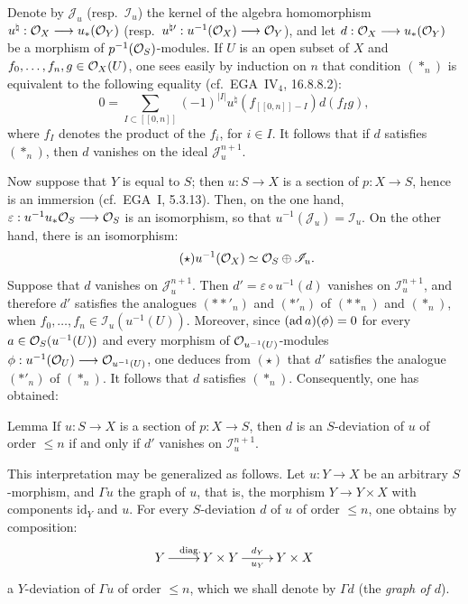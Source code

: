Denote by $\mathscr J_u$ (resp.\ $\mathscr I_u$) the kernel of the algebra homomorphism $u^\natural:\mathcal{O}_X\longrightarrow u_*(\mathcal{O}_Y)$ (resp.\ $u^{\natural\prime}:u^{-1}(\mathcal{O}_X)\longrightarrow\mathcal{O}_Y$), and let $d:\mathcal{O}_X\longrightarrow u_*(\mathcal{O}_Y)$ be a morphism of $p^{-1}(\mathcal{O}_S)$-modules. If $U$ is an open subset of $X$ and $f_0,\ldots,f_n,g\in\mathcal{O}_X(U)$, one sees easily by induction on $n$ that condition $(*_n)$ is equivalent to the following equality (cf.\ EGA~IV$_4$, 16.8.8.2):
\begin{equation}\tag{$**_n$}
0=\sum_{I\subset[[0,n]]}(-1)^{|I|}u^\natural(f_{[[0,n]]-I})d(f_Ig),
\end{equation}
where $f_I$ denotes the product of the $f_i$, for $i\in I$. It follows that if $d$ satisfies $(*_n)$, then $d$ vanishes on the ideal $\mathscr J_u^{n+1}$.

Now suppose that $Y$ is equal to $S$; then $u:S\to X$ is a section of $p:X\to S$, hence is an immersion (cf.\ EGA~I, 5.3.13). Then, on the one hand, $\varepsilon:u^{-1}u_*\mathcal{O}_S\longrightarrow\mathcal{O}_S$ is an isomorphism, so that $u^{-1}(\mathscr J_u)=\mathscr I_u$. On the other hand, there is an isomorphism:
\begin{equation}\tag{$\star$}u^{-1}(\mathcal{O}_X)\simeq\mathcal{O}_S\oplus\mathscr I_u.\end{equation}
Suppose that $d$ vanishes on $\mathscr J_u^{n+1}$. Then $d'=\varepsilon\circ u^{-1}(d)$ vanishes on $\mathscr I_u^{n+1}$, and therefore $d'$ satisfies the analogues $(**'_n)$ and $(*'_n)$ of $(**_n)$ and $(*_n)$, when $f_0,\ldots,f_n\in\mathscr I_u(u^{-1}(U))$. Moreover, since $(\operatorname{ad} a)(\phi)=0$ for every $a\in\mathcal{O}_S(u^{-1}(U))$ and every morphism of $\mathcal{O}_{u^{-1}(U)}$-modules $\phi:u^{-1}(\mathcal{O}_U)\longrightarrow\mathcal{O}_{u^{-1}(U)}$, one deduces from $(\star)$ that $d'$ satisfies the analogue $(*'_n)$ of $(*_n)$. It follows that $d$ satisfies $(*_n)$. Consequently, one has obtained:

\begin{enonce}{Lemma}{}
If $u:S\to X$ is a section of $p:X\to S$, then $d$ is an $S$-deviation of $u$ of order $\leq n$ if and only if $d'$ vanishes on $\mathscr I_u^{n+1}$.
\end{enonce}

This interpretation may be generalized as follows. Let $u:Y\to X$ be an arbitrary $S$-morphism, and $\Gamma u$ the graph of $u$, that is, the morphism $Y\to Y\times X$ with components $\mathrm{id}_Y$ and $u$. For every $S$-deviation $d$ of $u$ of order $\leq n$, one obtains by composition:
\[
\xymatrix{Y\ar[r]^{\mathrm{diag.}}&Y\times Y\ar[r]^{d_Y}_{u_Y}&Y\times X}
\]
a $Y$-deviation of $\Gamma u$ of order $\leq n$, which we shall denote by $\Gamma d$ (the \emph{graph of $d$}).

